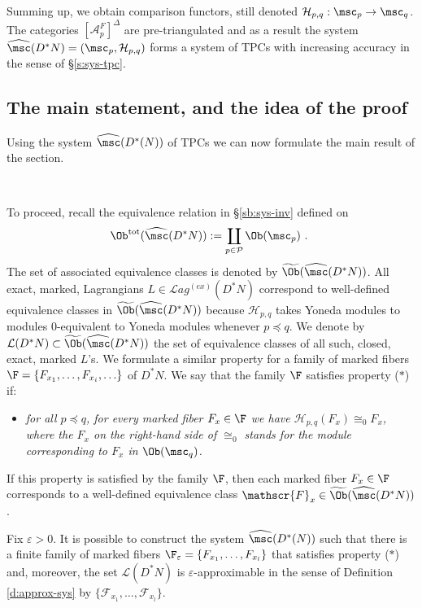 Summing up,  we obtain comparison functors, still denoted  
$\mathcal{H}_{p,q}: \msc_{p}\to \msc_{q}$. The categories $[\mathcal{A}^{F}_{p}]^{\Delta}$ are pre-triangulated and as a result the system  $\widehat{\msc}(D^{\ast}N) =(\msc_{p}, \mathcal{H}_{p,q})$ forms a system of TPCs with increasing accuracy in the sense of \S\ref{s:sys-tpc}.  


 \subsection{The main statement, and the idea of the proof}\label{subsec:state}

Using the system $\widehat{\msc}(D^{\ast}(N))$ of TPCs we can now formulate the main result of the section.

\

To proceed, recall the equivalence relation in \S\ref{sb:sys-inv} defined on 
$$\Ob^{\text{tot}}(\widehat{\msc}(D^{\ast}N)) := \coprod_{p\in \mathcal{P}} \Ob(\msc_p)~.~$$
 The set of associated equivalence classes
is denoted by $\widetilde{\Ob}(\widehat{\msc}(D^{\ast}N))$. 
All exact, marked, Lagrangians $L\in \mathcal{L}ag^{(ex)}(D^{\ast}N)$ correspond to well-defined equivalence classes in $\widetilde{\Ob}(\widehat{\msc}(D^{\ast}N))$  because $\mathcal{H}_{p,q}$ takes Yoneda modules to modules $0$-equivalent to Yoneda modules whenever $p\preceq q$. We denote
by $\mathcal{L}(D^{\ast}N)\subset \widetilde{\Ob}(\widehat{\msc}(D^{\ast}N))$ the set of equivalence classes of all such, closed, exact, marked $L$'s. We formulate a similar property for a family of marked fibers $\F=\{F_{x_{1}},\ldots, F_{x_{i}},\ldots\}$ of $D^{\ast}N$. We say that the family
$\F$ satisfies property ($\ast$) if:

\begin{itemize}
\item[($\ast$)]
 {\it for all $p \preceq q$, for every marked fiber
$F_{x} \in \F$ we have $\mathcal{H}_{p,q}(F_{x}) \cong_0 F_{x}$, where the $F_{x}$ on the right-hand side of $\cong_0$ stands for the  module corresponding to 
$F_{x}$ in $\Ob(\msc_{q})$.} 
\end{itemize}
If this property is satisfied by the family $\F$, then  each marked fiber $F_{x}\in \F$ corresponds to a well-defined equivalence class $\mathscr{F}_{x}\in\widetilde{\Ob}(\widehat{\msc}(D^{\ast}N))$. 


\begin{thm}\label{thm:nearby}
Fix $\varepsilon>0$. It is possible to construct the system $\widehat{\msc}(D^{\ast}(N))$ such that  there is a finite family of marked fibers $\F_{\varepsilon}=\{F_{x_{1}}, \ldots, F_{x_{l}}\}$ that satisfies property {\rm ($\ast$)} and, moreover, the set $\mathcal{L}(D^{\ast}N)$ is $\varepsilon$-approximable in the sense of Definition \ref{d:approx-sys} by $\{\mathscr{F}_{x_{1}},\ldots, \mathscr{F}_{x_{l}}\}$.
\end{thm}


